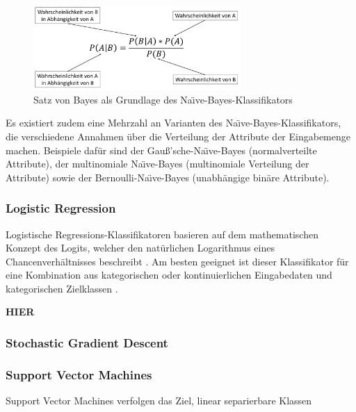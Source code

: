 \begin{figure}[]
    \centering
    \includegraphics[width=0.7\textwidth]{images/NB}
    \caption{Satz von Bayes als Grundlage des Na\"{\i}ve-Bayes-Klassifikators\label{fig:nb}}
\end{figure}

Es existiert zudem eine Mehrzahl an Varianten des Na\"{\i}ve-Bayes-Klassifikators, die verschiedene Annahmen über die Verteilung der Attribute der Eingabemenge machen. Beispiele dafür sind der Gauß'sche-Na\"{\i}ve-Bayes (normalverteilte Attribute), der multinomiale Na\"{\i}ve-Bayes (multinomiale Verteilung der Attribute) sowie der Bernoulli-Na\"{\i}ve-Bayes (unabhängige binäre Attribute).

\subsubsection*{Logistic Regression}
Logistische Regressions-Klassifikatoren basieren auf dem mathematischen Konzept des Logits, welcher den natürlichen Logarithmus eines Chancenverhältnisses beschreibt \cite{Peng2002}. Am besten geeignet ist dieser Klassifikator für eine Kombination aus kategorischen oder kontinuierlichen Eingabedaten und kategorischen Zielklassen \cite{Peng2002}.

\textbf{HIER}

\subsubsection*{Stochastic Gradient Descent}
\cite{Bottou2010}

\subsubsection*{Support Vector Machines}
Support Vector Machines verfolgen das Ziel, linear separierbare Klassen 
\cite{Tzotsos2006}


